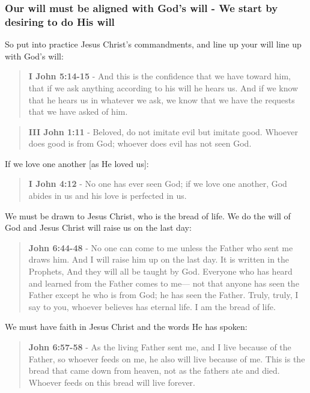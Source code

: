 \documentclass[11pt]{article}
\begin{document}
\subsubsection{Our will must be aligned with God's will - We start by desiring to do His will}
\label{sec:org326e9ba}
So put into practice Jesus Christ's commandments, and line up your will line up with God's will:

\begin{quote}
\textbf{I John 5:14-15} - And this is the confidence that we have toward him, that if we ask anything according to his will he hears us. And if we know that he hears us in whatever we ask, we know that we have the requests that we have asked of him.
\end{quote}

\begin{quote}
\textbf{III John 1:11} - Beloved, do not imitate evil but imitate good. Whoever does good is from God; whoever does evil has not seen God.
\end{quote}

If we love one another [as He loved us]:

\begin{quote}
\textbf{I John 4:12} - No one has ever seen God; if we love one another, God abides in us and his love is perfected in us.
\end{quote}

We must be drawn to Jesus Christ, who is the bread of life. We do the will of God and Jesus Christ will raise us on the last day:

\begin{quote}
\textbf{John 6:44-48} - No one can come to me unless the Father who sent me draws him. And I will raise him up on the last day. It is written in the Prophets, And they will all be taught by God. Everyone who has heard and learned from the Father comes to me— not that anyone has seen the Father except he who is from God; he has seen the Father. Truly, truly, I say to you, whoever believes has eternal life. I am the bread of life.
\end{quote}

We must have faith in Jesus Christ and the words He has spoken:

\begin{quote}
\textbf{John 6:57-58} - As the living Father sent me, and I live because of the Father, so whoever feeds on me, he also will live because of me. This is the bread that came down from heaven, not as the fathers ate and died. Whoever feeds on this bread will live forever.
\end{quote}
\end{document}

